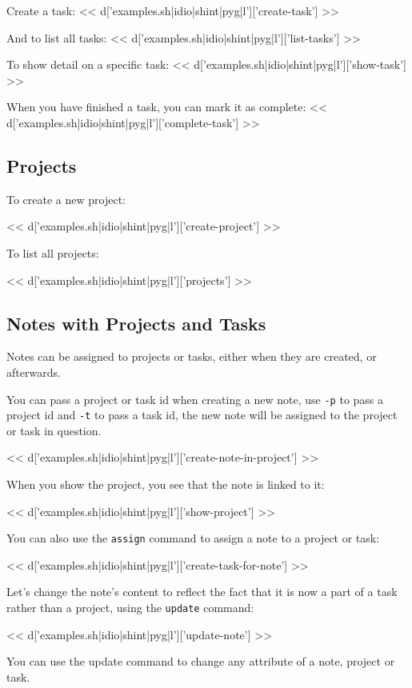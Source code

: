 \documentclass[a4paper]{amsart}
\begin{document}
{Create a task:
<< d['examples.sh|idio|shint|pyg|l']['create-task'] >>

And to list all tasks:
<< d['examples.sh|idio|shint|pyg|l']['list-tasks'] >>

To show detail on a specific task:
<< d['examples.sh|idio|shint|pyg|l']['show-task'] >>

When you have finished a task, you can mark it as complete:
<< d['examples.sh|idio|shint|pyg|l']['complete-task'] >>

\subsection{Projects}

To create a new project:

<< d['examples.sh|idio|shint|pyg|l']['create-project'] >>

To list all projects:

<< d['examples.sh|idio|shint|pyg|l']['projects'] >>

\subsection{Notes with Projects and Tasks}

Notes can be assigned to projects or tasks, either when they are created, or
afterwards.

You can pass a project or task id when creating a new note, use \verb|-p| to
pass a project id and \verb|-t| to pass a task id, the new note will be
assigned to the project or task in question.

<< d['examples.sh|idio|shint|pyg|l']['create-note-in-project'] >>

When you show the project, you see that the note is linked to it:

<< d['examples.sh|idio|shint|pyg|l']['show-project'] >>

You can also use the \verb|assign| command to assign a note to a project or task:

<< d['examples.sh|idio|shint|pyg|l']['create-task-for-note'] >>

Let's change the note's content to reflect the fact that it is now a part of a
task rather than a project, using the \verb|update| command:

<< d['examples.sh|idio|shint|pyg|l']['update-note'] >>

You can use the update command to change any attribute of a note, project or task.

}
\end{document}
